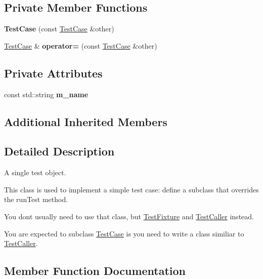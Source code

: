 \subsection*{Private Member Functions}
\begin{DoxyCompactItemize}
\item 
{\bfseries Test\+Case} (const \hyperlink{class_test_case}{Test\+Case} \&other)\hypertarget{class_test_case_a54cae591175ad9bdf51ece7dc6768be5}{}\label{class_test_case_a54cae591175ad9bdf51ece7dc6768be5}

\item 
\hyperlink{class_test_case}{Test\+Case} \& {\bfseries operator=} (const \hyperlink{class_test_case}{Test\+Case} \&other)\hypertarget{class_test_case_a5630dab970d7475618f14aa5b2a3d132}{}\label{class_test_case_a5630dab970d7475618f14aa5b2a3d132}

\end{DoxyCompactItemize}
\subsection*{Private Attributes}
\begin{DoxyCompactItemize}
\item 
const std\+::string {\bfseries m\+\_\+name}\hypertarget{class_test_case_afee3ee060394df6d820bfe4628c5fc81}{}\label{class_test_case_afee3ee060394df6d820bfe4628c5fc81}

\end{DoxyCompactItemize}
\subsection*{Additional Inherited Members}


\subsection{Detailed Description}
A single test object. 

This class is used to implement a simple test case\+: define a subclass that overrides the run\+Test method.

You don\textquotesingle{}t usually need to use that class, but \hyperlink{class_test_fixture}{Test\+Fixture} and \hyperlink{class_test_caller}{Test\+Caller} instead.

You are expected to subclass \hyperlink{class_test_case}{Test\+Case} is you need to write a class similiar to \hyperlink{class_test_caller}{Test\+Caller}. 

\subsection{Member Function Documentation}

